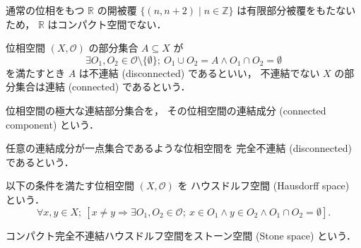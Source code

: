 \documentclass[titlepage]{ltjsreport}
\begin{document}
\begin{example}
  通常の位相をもつ
  $\mathbb{R}$
  の開被覆
  $\{(n,n+2)\mid n\in\mathbb{Z}\}$
  は有限部分被覆をもたないため，
  $\mathbb{R}$
  はコンパクト空間でない．
\end{example}

\begin{definition}[連結，不連結]
  位相空間 $(X,\mathcal{O})$ の部分集合 $A\subseteq X$ が
  \begin{equation}
    \exists O_1,O_2\in\mathcal{O}\setminus\{\emptyset\};
    \ O_1\cup O_2=A\wedge O_1\cap O_2=\emptyset
  \end{equation}
  を満たすとき $A$ は不連結 (disconnected) であるといい，
  不連結でない $X$ の部分集合は連結 (connected) であるという．
\end{definition}

\begin{definition}[連結成分]
  位相空間の極大な連結部分集合を，
  その位相空間の連結成分 (connected component) という．
\end{definition}

\begin{definition}[完全不連結]
  任意の連結成分が一点集合であるような位相空間を
  完全不連結 (disconnected) であるという．
\end{definition}

\begin{definition}[ハウスドルフ空間]
  以下の条件を満たす位相空間 $(X,\mathcal{O})$ を
  ハウスドルフ空間 (Hausdorff space) という．
  \begin{equation}
    \forall x,y\in X;
    \ \left[x\neq y\Longrightarrow\exists O_1,O_2\in\mathcal{O};
      \ x\in O_1\wedge y\in O_2\wedge O_1\cap O_2=\emptyset\right].
  \end{equation}
\end{definition}

\begin{definition}[ストーン空間]\label{def:stone-space}
  コンパクト完全不連結ハウスドルフ空間をストーン空間 (Stone space) という．
\end{definition}
\end{document}
